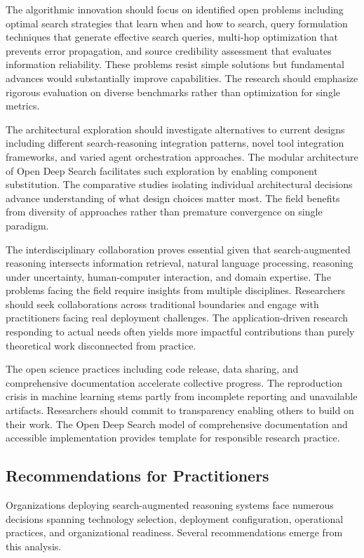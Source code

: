 The algorithmic innovation should focus on identified open problems including optimal search strategies that learn when and how to search, query formulation techniques that generate effective search queries, multi-hop optimization that prevents error propagation, and source credibility assessment that evaluates information reliability. These problems resist simple solutions but fundamental advances would substantially improve capabilities. The research should emphasize rigorous evaluation on diverse benchmarks rather than optimization for single metrics.

The architectural exploration should investigate alternatives to current designs including different search-reasoning integration patterns, novel tool integration frameworks, and varied agent orchestration approaches. The modular architecture of Open Deep Search facilitates such exploration by enabling component substitution. The comparative studies isolating individual architectural decisions advance understanding of what design choices matter most. The field benefits from diversity of approaches rather than premature convergence on single paradigm.

The interdisciplinary collaboration proves essential given that search-augmented reasoning intersects information retrieval, natural language processing, reasoning under uncertainty, human-computer interaction, and domain expertise. The problems facing the field require insights from multiple disciplines. Researchers should seek collaborations across traditional boundaries and engage with practitioners facing real deployment challenges. The application-driven research responding to actual needs often yields more impactful contributions than purely theoretical work disconnected from practice.

The open science practices including code release, data sharing, and comprehensive documentation accelerate collective progress. The reproduction crisis in machine learning stems partly from incomplete reporting and unavailable artifacts. Researchers should commit to transparency enabling others to build on their work. The Open Deep Search model of comprehensive documentation and accessible implementation provides template for responsible research practice.

\subsection{Recommendations for Practitioners}

Organizations deploying search-augmented reasoning systems face numerous decisions spanning technology selection, deployment configuration, operational practices, and organizational readiness. Several recommendations emerge from this analysis.

